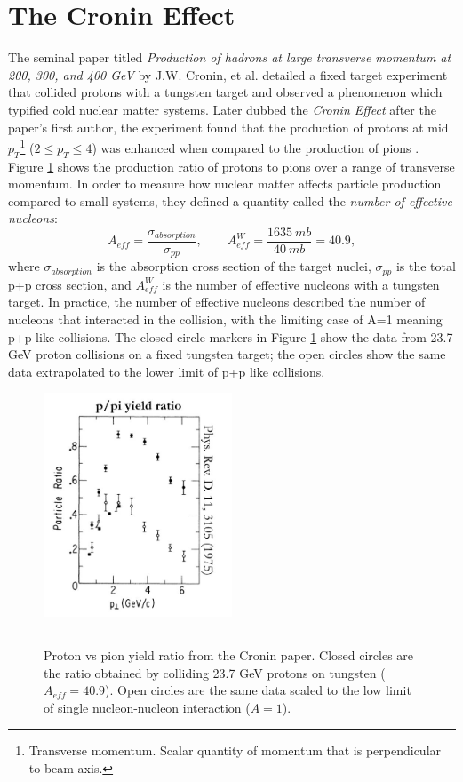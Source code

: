 \section{The Cronin Effect}
The seminal paper titled \textit{Production of hadrons at large transverse momentum at 200, 300, and 400 GeV} by J.W. Cronin, et al. detailed a fixed target experiment that collided protons with a tungsten target and observed a phenomenon which typified cold nuclear matter systems. Later dubbed the \textit{Cronin Effect} after the paper's first author, the experiment found that the production of protons at mid $p_{T}$\footnote{Transverse momentum. Scalar quantity of momentum that is perpendicular to beam axis.} ($2\leq p_{T} \leq 4$) was enhanced when compared to the production of pions \citep{croninpaper}. Figure \ref{fig:croninratio} shows the production ratio of protons to pions over a range of transverse momentum. In order to measure how nuclear matter affects particle production compared to small systems, they defined a quantity called the \textit{number of effective nucleons}:
\begin{equation}
A_{eff} = \frac{\sigma_{absorption}}{\sigma_{pp}}, \qquad A^W_{eff} = \frac{1635\: mb}{40\: mb} = 40.9,
\end{equation}
where $\sigma_{absorption}$ is the absorption cross section of the target nuclei, $\sigma_{pp}$ is the total p+p cross section, and $A^W_{eff}$ is the number of effective nucleons with a tungsten target. In practice, the number of effective nucleons described the number of nucleons that interacted in the collision, with the limiting case of A=1 meaning p+p like collisions. The closed circle markers in Figure \ref{fig:croninratio} show the data from 23.7 GeV proton collisions on a fixed tungsten target; the open circles show the same data extrapolated to the lower limit of p+p like collisions.
\begin{figure}[H]
  \centering    
    \includegraphics[width=0.5\textwidth]{prevplots/croninratio.JPG}
\rule{35em}{0.5pt}
  \caption[Proton vs pion yield ratio from the Cronin paper]{Proton vs pion yield ratio from the Cronin paper. Closed circles are the ratio obtained by colliding 23.7 GeV protons on tungsten ($A_{eff}= 40.9$). Open circles are the same data scaled to the low limit of single nucleon-nucleon interaction ($A=1$).}
  \label{fig:croninratio}    
\end{figure}

